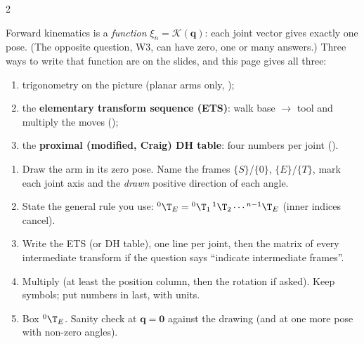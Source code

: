 \begin{multicols}{2}

Forward kinematics is a \emph{function} $\xi_n=\mathcal K(\mathbf q)$: each joint vector gives exactly one pose. (The opposite question, W3, can have zero, one or many answers.) Three ways to write that function are on the slides, and this page gives all three:
\begin{enumerate}
\item trigonometry on the picture (planar arms only, );
\item the \textbf{elementary transform sequence (ETS)}: walk base $\to$ tool and multiply the moves ();
\item the \textbf{proximal (modified, Craig) DH table}: four numbers per joint ().
\end{enumerate}
\begin{recipe}
\begin{enumerate}
\item Draw the arm in its zero pose. Name the frames $\{S\}$/$\{0\}$, $\{E\}$/$\{T\}$, mark each joint axis and the \emph{drawn} positive direction of each angle.
\item State the general rule you use: ${}^0\T_E={}^0\T_1\,{}^1\T_2\cdots{}^{n-1}\T_E$ (inner indices cancel).
\item Write the ETS (or DH table), one line per joint, then the matrix of every intermediate transform if the question says ``indicate intermediate frames''.
\item Multiply (at least the position column, then the rotation if asked). Keep symbols; put numbers in last, with units.
\item Box ${}^0\T_E$. Sanity check at $\mathbf q=\mathbf 0$ against the drawing (and at one more pose with non-zero angles).
\end{enumerate}
\end{recipe}


\end{multicols}
